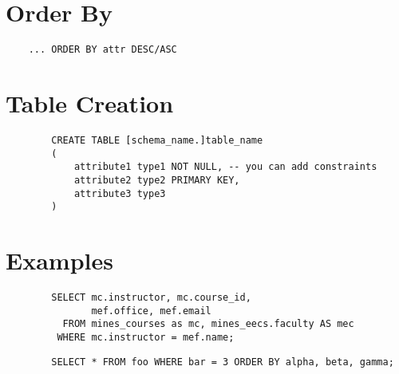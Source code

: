 \documentclass{cheatsheet}
\begin{document}
\begin{multicols*}{2}
    \section{Order By}
    \begin{verbatim}
    ... ORDER BY attr DESC/ASC
    \end{verbatim}

    \section{Table Creation}
    \begin{verbatim}
        CREATE TABLE [schema_name.]table_name
        (
            attribute1 type1 NOT NULL, -- you can add constraints
            attribute2 type2 PRIMARY KEY,
            attribute3 type3
        )
    \end{verbatim}

    \section{Examples}
    \begin{verbatim}
        SELECT mc.instructor, mc.course_id,
               mef.office, mef.email
          FROM mines_courses as mc, mines_eecs.faculty AS mec
         WHERE mc.instructor = mef.name;
    \end{verbatim}
    \begin{verbatim}
        SELECT * FROM foo WHERE bar = 3 ORDER BY alpha, beta, gamma;
    \end{verbatim}


\end{multicols*}
\end{document}
